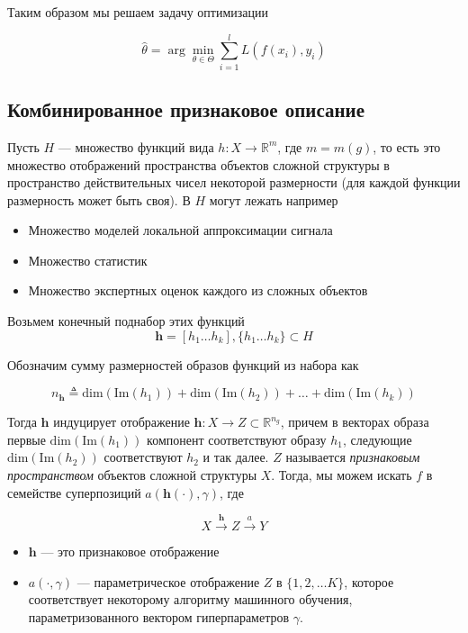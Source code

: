 \documentclass[12pt, fleqn, unicode]{article}
\newcommand{\bh}{\mathbf{h}}
\newcommand{\R}{\mathbb{R}}
\begin{document}
Таким образом мы решаем задачу оптимизации

$$
\hat{\theta} = \arg\min_{\theta \in \Theta} \sum_{i = 1}^l L(f(x_i), y_i)
$$

\subsection{Комбинированное признаковое описание}

Пусть $H$ --- множество функций вида
$h: X \to \R^m$, где $m = m(g)$, то есть это множество отображений
пространства объектов сложной структуры в пространство действительных чисел
некоторой размерности (для каждой функции размерность может быть своя). В
$H$ могут лежать например

\begin{itemize}
    \item Множество моделей локальной аппроксимации сигнала
    \item Множество статистик
    \item Множество экспертных оценок каждого из сложных объектов
\end{itemize}

Возьмем конечный поднабор этих функций
$$
\bh = [h_1\ldots h_k], \{h_1\ldots h_k\} \subset H
$$

Обозначим сумму размерностей образов функций из набора как

$$
n_\bh \triangleq \mathrm{dim}(\mathrm{Im}(h_1)) +
\mathrm{dim}(\mathrm{Im}(h_2)) + \ldots +
\mathrm{dim}(\mathrm{Im}(h_k))
$$

Тогда $\bh$ индуцирует отображение $\bh: X \to Z \subset \R^{n_g}$,
причем в векторах образа первые $\mathrm{dim}(\mathrm{Im}(h_1))$ компонент соответствуют
образу $h_1$, следующие $\mathrm{dim}(\mathrm{Im}(h_2))$ соответствуют $h_2$
и так далее. $Z$ называется \textit{признаковым пространством}
объектов сложной структуры $X$. Тогда, мы можем искать $f$ в семействе
суперпозиций $a(\bh(\cdot), \gamma)$, где

$$
X \xrightarrow{\bh} Z \xrightarrow{a} Y
$$

\begin{itemize}
    \item $\bh$ --- это признаковое отображение
    \item $a(\cdot, \gamma)$ --- параметрическое отображение $Z$ в $\{1, 2, \ldots K\}$,
    которое соответствует некоторому алгоритму машинного обучения,
    параметризованного вектором гиперпараметров $\gamma$.
\end{itemize}
\end{document}
